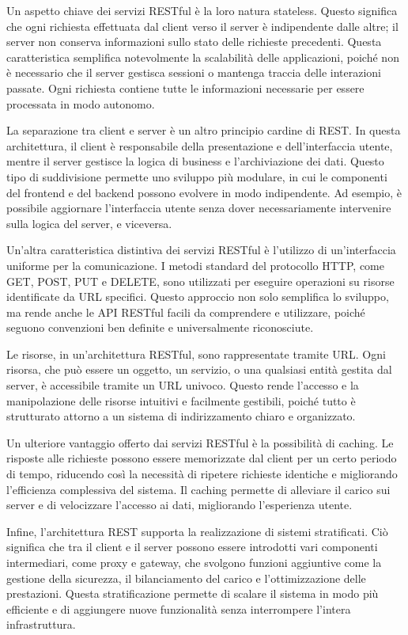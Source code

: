 \documentclass[a4paper,twoside,12pt]{toptesi}
\begin{document}
Un aspetto chiave dei servizi RESTful è la loro natura stateless. Questo significa che ogni richiesta effettuata dal client verso il server è indipendente dalle altre; il server non conserva informazioni sullo stato delle richieste precedenti. Questa caratteristica semplifica notevolmente la scalabilità delle applicazioni, poiché non è necessario che il server gestisca sessioni o mantenga traccia delle interazioni passate. Ogni richiesta contiene tutte le informazioni necessarie per essere processata in modo autonomo.

La separazione tra client e server è un altro principio cardine di REST. In questa architettura, il client è responsabile della presentazione e dell'interfaccia utente, mentre il server gestisce la logica di business e l'archiviazione dei dati. Questo tipo di suddivisione permette uno sviluppo più modulare, in cui le componenti del frontend e del backend possono evolvere in modo indipendente. Ad esempio, è possibile aggiornare l'interfaccia utente senza dover necessariamente intervenire sulla logica del server, e viceversa.

Un'altra caratteristica distintiva dei servizi RESTful è l'utilizzo di un'interfaccia uniforme per la comunicazione. I metodi standard del protocollo HTTP, come GET, POST, PUT e DELETE, sono utilizzati per eseguire operazioni su risorse identificate da URL specifici. Questo approccio non solo semplifica lo sviluppo, ma rende anche le API RESTful facili da comprendere e utilizzare, poiché seguono convenzioni ben definite e universalmente riconosciute.

Le risorse, in un'architettura RESTful, sono rappresentate tramite URL. Ogni risorsa, che può essere un oggetto, un servizio, o una qualsiasi entità gestita dal server, è accessibile tramite un URL univoco. Questo rende l'accesso e la manipolazione delle risorse intuitivi e facilmente gestibili, poiché tutto è strutturato attorno a un sistema di indirizzamento chiaro e organizzato.

Un ulteriore vantaggio offerto dai servizi RESTful è la possibilità di caching. Le risposte alle richieste possono essere memorizzate dal client per un certo periodo di tempo, riducendo così la necessità di ripetere richieste identiche e migliorando l'efficienza complessiva del sistema. Il caching permette di alleviare il carico sui server e di velocizzare l'accesso ai dati, migliorando l'esperienza utente.

Infine, l'architettura REST supporta la realizzazione di sistemi stratificati. Ciò significa che tra il client e il server possono essere introdotti vari componenti intermediari, come proxy e gateway, che svolgono funzioni aggiuntive come la gestione della sicurezza, il bilanciamento del carico e l'ottimizzazione delle prestazioni. Questa stratificazione permette di scalare il sistema in modo più efficiente e di aggiungere nuove funzionalità senza interrompere l'intera infrastruttura.
\end{document}

